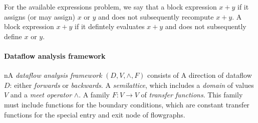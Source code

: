 \documentclass{memo}
\begin{document}
For the available expressions problem, we say that a block 
expression $x + y$ if it assigns (or may assign)  $x$ or $y$ and does not
subsequently recompute $x + y$. A block  expression $x + y$ if
it defintely evaluates $x + y$ and does not subsequently define $x$ or $y$. 





\paragraph{Dataflow analysis framework}
nA {\em dataflow analysis framework} $(D, V, \wedge, F)$ consists of
\ben
\w A direction of dataflow $D$: either {\em forwards\/} or {\em backwards\/}.
\w A {\em semilattice}, which includes a {\em domain\/} of values $V$ and a
   {\em meet operator} $\wedge$. 
\w A family $F: V \rightarrow V$ of {\em transfer functions\/}. This family
must include functions for the boundary conditions, which are constant
transfer functions for the special entry and exit node of flowgraphs.
\een
\end{document}
